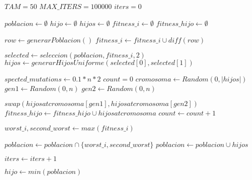 \begin{algorithm}[H]
  \begin{algorithmic}[1]
      \State $TAM = 50$
      \State $MAX\_ITERS = 100000$
      \State $iters = 0$

      \State $poblacion \gets \emptyset$ 
      \State $hijo \gets \emptyset$ 
      \State $hijos \gets \emptyset$
      \State $fitness\_i \gets \emptyset$
      \State $fitness\_hijo \gets \emptyset$
      
        \State $row \gets generarPoblacion()$
        \State $fitness\_i \gets fitness\_i \cup diff(row)$
      \EndFor

        
        \State $selected \gets seleccion(poblacion,fitness\_i,2)$
        \State $hijos \gets generarHijosUniforme(selected[0],selected[1])$
        
        \State $spected\_mutations \gets 0.1*n*2$
        \State $count = 0$
          \State $cromosoma \gets Random(0,|hijos|)$ 
          \State $gen1 \gets Random(0,n)$
          \State $gen2 \gets Random(0,n)$ 

           
            \State $swap(hijos at cromosoma[gen1], hijos at cromosoma[gen2])$ 
            \State $fitness\_hijo \gets fitness\_hijo \cup hijos at cromosoma$ 
          \EndIf
          \State $count \gets count +1 $
        \EndWhile

        \State $worst\_i,second\_worst \gets max(fitness\_i)$ 
       
        \State $poblacion \gets poblacion \cap \{worst\_i,second\_worst\}$
        \State $poblacion \gets poblacion \cup {hijos}$ 
        
        \State $iters \gets iters + 1 $
      \EndWhile
      
      \State $hijo \gets min(poblacion)$
      \State {}
    \EndFunction
  \end{algorithmic}
\end{algorithm}

